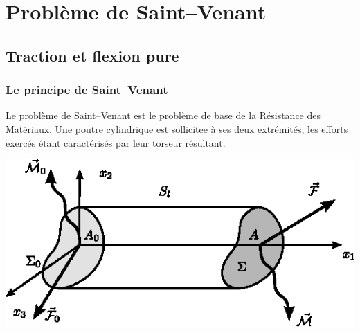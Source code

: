 \chapter{Problème de Saint--Venant} \label{chap:Ch07} 
\section{Traction et flexion pure} \label{sec:Ch07-1}
\subsection{Le principe de Saint--Venant} \label{ssec:Ch07-1.1}
Le problème de Saint--Venant est le problème de base de la Résistance des Matériaux.
Une poutre cylindrique est sollicitee à ses deux extrémités, les efforts exercés étant caractérisés par leur torseur résultant.

\begin{center}
\includegraphics{../images/T1_Ch07-01}
\end{center}

